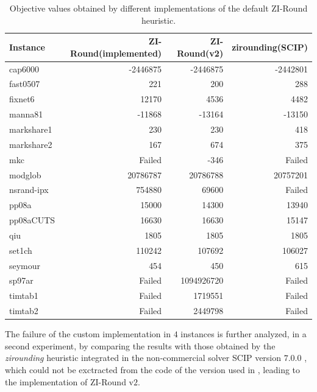 \documentclass[a4paper,12pt]{book}
\begin{document}
\begin{table}[]
	\centering
	\begin{tabular}{@{}lrrr@{}}
	\toprule
	Instance   & ZI-Round(implemented) & ZI-Round(v2) & zirounding(SCIP) \\ \midrule
	cap6000    & -2446875              & -2446875     & -2442801         \\
	fast0507   & 221                   & 200          & 288              \\
	fixnet6    & 12170                 & 4536         & 4482             \\
	manna81    & -11868                & -13164       & -13150           \\
	markshare1 & 230                   & 230          & 418              \\
	markshare2 & 167                   & 674          & 375              \\
	mkc        & Failed                & -346      & Failed           \\
	modglob    & 20786787           & 20786788     & 20757201      \\
	nsrand-ipx & 754880                & 69600        & Failed           \\
	pp08a      & 15000                 & 14300        & 13940            \\
	pp08aCUTS  & 16630           & 16630      & 15147      \\
	qiu        & 1805           & 1805      & 1805      \\
	set1ch     & 110242              & 107692     & 106027           \\
	seymour    & 454                   & 450          & 615              \\
	sp97ar     & Failed                & 1094926720   & Failed           \\
	timtab1    & Failed                & 1719551      & Failed           \\
	timtab2    & Failed                & 2449798      & Failed           \\ \bottomrule
	\end{tabular}
	\caption{Objective values obtained by different implementations of the default ZI-Round heuristic.}
	\label{tb:exp-prelim-1}
\end{table}
The failure of the custom implementation in $4$ instances is further analyzed, in a second experiment, by comparing the results with those obtained by the \textit{zirounding} heuristic integrated in the non-commercial solver SCIP version $7$.$0$.$0$ \cite{scip}, which could not be exctracted from the code of the version used in \cite{wallace2010}, leading to the implementation of ZI-Round v$2$. \par 
\end{document}
